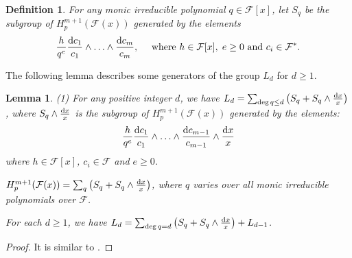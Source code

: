 \documentclass[times,10pt]{amsart}
\newcommand{\dd}{{\rm d}}
\newcommand{\F}{\ensuremath{\mathcal{F}}}
\newtheorem{defn}[thm]{Definition}%
\newtheorem{lemma}[thm]{Lemma}%
\begin{document}
   \begin{defn}\label{definse}
        For any  monic  irreducible polynomial $q\in \F[x]$, let $S_q$ be the subgroup of $H_p^{m+1}(\F(x))$ generated by the elements $$  \frac{h}{q^e} \frac{\dd c_1}{c_1}\wedge\ldots\wedge \frac{\dd c_m}{c_m},\quad \text{ where } h\in \F[x], \hspace{1mm} e\geq 0  \text{ and }c_i\in \F^*.$$
   \end{defn}
   The following lemma describes some generators of  the group $L_d$ for $d\geq1$.
   \begin{lemma}\label{lgener}(1) For any positive integer $d$, we have $L_d= \sum_{ \deg q\leq d}\left(S_q+S_q\wedge \frac{\dd x}{x}\right)$, where $S_q\wedge \frac{\dd x}{x}$ is the subgroup of $H_p^{m+1}(\F(x))$ generated by the elements: $$  \frac{h}{q^e} \frac{\dd c_1}{c_1}\wedge \ldots\wedge \frac{\dd c_{m-1}}{c_{m-1}}\wedge \frac{\dd x}{x}$$ where $ h\in \F[x]$, $c_i\in \F$ and $e\geq 0$.

   
        $H_p^{m+1}(\F(x))= \sum_{q}\left( S_q+ S_q \wedge \frac{\dd x}{x}\right)$, where $q$ varies over  all monic   irreducible polynomials over $\F$.
       \vspace{1mm}

       
         For each $d\geq 1$, we have $ L_d= \sum_{ \deg q=d}\left( S_q+S_q\wedge \frac{\dd x}{x}\right)+L_{d-1}$.
   \end{lemma}

   \begin{proof}
       It is similar to \cite[Lemma 3.6]{ex}.
   \end{proof}
\end{document}
